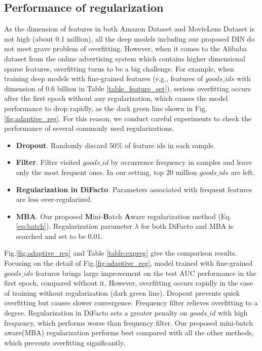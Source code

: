 \subsection{Performance of regularization}
\label{sec:reg}
As the dimension of features in both Amazon Dataset and MovieLens Dataset is not high (about 0.1 million), 
all the deep models including our proposed DIN do not meet grave problem of overfitting.
However, when it comes to the Alibaba dataset from the online advertising system which contains higher dimensional sparse features, overfitting turns to be a big challenge. 
For example, when training deep models with fine-grained features (e.g., features of $goods\_ids$ with dimension of 0.6 billion in Table \ref{table_feature_set}), serious overfitting occurs after the first epoch without any regularization, which causes the model performance to drop rapidly, as the dark green line shown in Fig.\ref{fig:adaptive_reg}.     
For this reason, we conduct careful experiments to check the performance of several commonly used regularizations.
\begin{itemize}
\item \textbf{Dropout\cite{dropout}}. Randomly discard $50\%$ of feature ids in each sample.
\item \textbf{Filter}. Filter visited $goods\_id$ by occurrence frequency in samples and leave only the most frequent ones. In our setting, top $20$ million $goods\_ids$ are left.
\item \textbf{Regularization in DiFacto\cite{difacto}}. Parameters associated with frequent features are less over-regularized.
\item \textbf{MBA}. Our proposed \textbf{M}ini-\textbf{B}atch \textbf{A}ware regularization method (Eq.\ref{eq:batch}). Regularization parameter $\lambda$ for both DiFacto and MBA is searched and set to be $0.01$.
\end{itemize}



Fig.\ref{fig:adaptive_reg} and Table \ref{table:expreg} give the comparison results. 
Focusing on the detail of Fig.\ref{fig:adaptive_reg}, model trained with fine-grained $goods\_ids$ features brings large improvement on the test AUC performance in the first epoch, compared without it. 
However, overfitting occurs rapidly in the case of training without regularization (dark green line).   
Dropout prevents quick overfitting but causes slower convergence. 
Frequency filter relieves overfitting to a degree.
Regularization in DiFacto sets a greater penalty on $goods\_id$ with high frequency, which performs worse than frequency filter.
Our proposed mini-batch aware(MBA) regularization performs best compared with all the other methods, which prevents overfitting significantly. 


